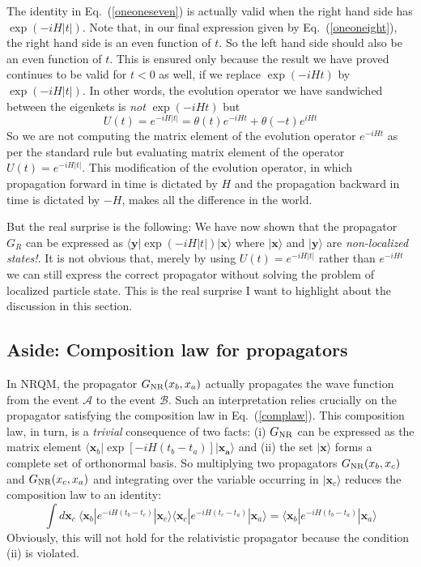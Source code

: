 \documentclass{article}
\def\eq#1{{Eq.~(\ref{#1})}}
\def\ket#1{|#1\rangle}                    %
\def\bk#1#2#3{{\langle #1|#2|#3\rangle}}  %
\begin{document}
The identity in \eq{oneoneseven} is actually valid when the right hand side has $\exp(-iH|t|)$. Note that, in our final expression given by \eq{oneoneight}, the right hand side is an even function of $t$. So the left hand side should also be an even function of $t$. This is ensured only because the result we have proved continues to be valid for $t<0$ as well, if we replace $\exp(-iHt)$ by $\exp(-iH|t|)$. In other words, the evolution operator we have sandwiched between the eigenkets is \textit{not} $\exp(-iHt)$ but 
\begin{equation}
 U(t) = e^{-iH|t|} = \theta(t) e^{-iHt} + \theta(-t) e^{iHt} 
\end{equation} 
So we are not computing the matrix element of the evolution operator $e^{-iHt}$ as per the standard rule but evaluating matrix element of the operator $U(t) = e^{-iH|t|}$. This modification of the evolution operator, in which propagation forward in time is dictated by $H$ and the propagation backward in time is dictated by $-H$, makes all the difference in the world. 

But the real surprise is the following: We have now shown that the propagator $G_R$ can be expressed as $\bk{\bm y}{\exp(-iH|t|)}{\bm x}$ where $\ket{\bm x}$ and $\ket{\bm y}$ are \textit{non-localized states!}. It is not obvious that, merely by using $U(t) = e^{-iH|t|}$ rather than $e^{-iHt}$ we can still express the correct propagator without solving the problem of localized particle state. This is the real surprise I want to highlight about the discussion in this section.



\subsection{Aside: Composition law for propagators}\label{sec:compo}

 In NRQM, the propagator $G_{\rm NR}(x_b,x_a)$ actually propagates the wave function from the event $\mathcal{A}$ to the event $\mathcal{B}$. Such an interpretation relies crucially on the propagator satisfying the composition law in \eq{complaw}. This composition law, in turn,  is a \textit{trivial} consequence of two facts: (i) $G_{\rm NR}$ can be expressed as the matrix element $\bk{\bm{x}_b}{\exp[-iH(t_b - t_a)]}{\bm{x_a}}$ and (ii) the set $\ket{\bm{x}}$ forms a complete set of orthonormal basis. So multiplying two propagators $G_{\rm NR}(x_b,x_c)$ and $G_{\rm NR}(x_c,x_a)$  and integrating over the variable occurring in $\ket{\bm{x}_c}$  reduces the composition law to an identity:
 \begin{equation}
  \int d\bm{x}_c\ \bk{\bm{x}_b}{e^{-iH(t_b - t_c)}}{\bm{x}_c} \bk{\bm{x}_c}{e^{-iH(t_c - t_a)}}{\bm{x}_a}
  = \bk{\bm{x}_b}{e^{-iH(t_b - t_a)}}{\bm{x}_a}
 \end{equation} 
 Obviously, this will not hold for the relativistic propagator because  the condition  (ii) is violated. 
 
\end{document}
